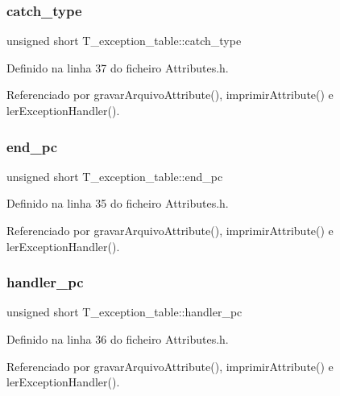 \subsubsection{\texorpdfstring{catch\+\_\+type}{catch\_type}}
{\footnotesize\ttfamily unsigned short T\+\_\+exception\+\_\+table\+::catch\+\_\+type}



Definido na linha 37 do ficheiro Attributes.\+h.



Referenciado por gravar\+Arquivo\+Attribute(), imprimir\+Attribute() e ler\+Exception\+Handler().

\mbox{\label{structT__exception__table_a464d6f303abe547b03a8ac819db09c42}} 
\subsubsection{\texorpdfstring{end\+\_\+pc}{end\_pc}}
{\footnotesize\ttfamily unsigned short T\+\_\+exception\+\_\+table\+::end\+\_\+pc}



Definido na linha 35 do ficheiro Attributes.\+h.



Referenciado por gravar\+Arquivo\+Attribute(), imprimir\+Attribute() e ler\+Exception\+Handler().

\mbox{\label{structT__exception__table_a2ffa8b7191177ca3689728d9eb329323}} 
\subsubsection{\texorpdfstring{handler\+\_\+pc}{handler\_pc}}
{\footnotesize\ttfamily unsigned short T\+\_\+exception\+\_\+table\+::handler\+\_\+pc}



Definido na linha 36 do ficheiro Attributes.\+h.



Referenciado por gravar\+Arquivo\+Attribute(), imprimir\+Attribute() e ler\+Exception\+Handler().

